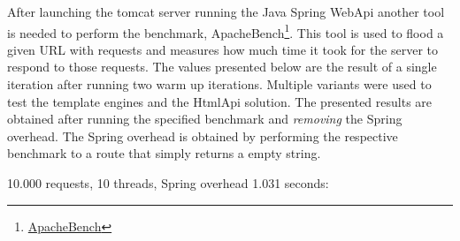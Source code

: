 \noindent
After launching the tomcat server running the Java Spring WebApi another tool is needed to perform the benchmark, ApacheBench\footnote{\href{https://httpd.apache.org/docs/2.4/programs/ab.html}{ApacheBench}}. This tool is used to flood a given \ac{URL} with requests and measures how much time it took for the server to respond to those requests. The values presented below are the result of a single iteration after running two warm up iterations. Multiple variants were used to test the template engines and the HtmlApi solution. The presented results are obtained after running the specified benchmark and \textit{removing} the Spring overhead. The Spring overhead is obtained by performing the respective benchmark to a route that simply returns a empty string.

\newpage

10.000 requests, 10 threads, Spring overhead 1.031 seconds:

